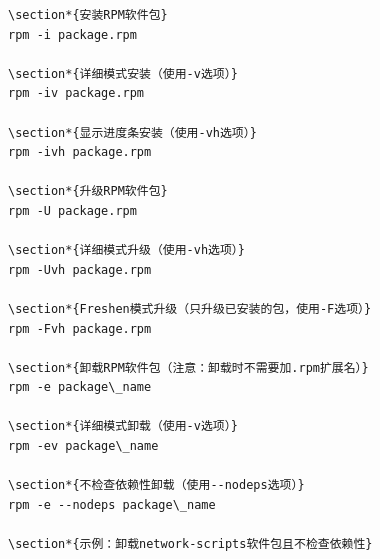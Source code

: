 \documentclass[12pt,UTF8]{ctexbook}
\begin{document}
\begin{verbatim}
\section*{安装RPM软件包}
rpm -i package.rpm

\section*{详细模式安装（使用-v选项）}
rpm -iv package.rpm

\section*{显示进度条安装（使用-vh选项）}
rpm -ivh package.rpm

\section*{升级RPM软件包}
rpm -U package.rpm

\section*{详细模式升级（使用-vh选项）}
rpm -Uvh package.rpm

\section*{Freshen模式升级（只升级已安装的包，使用-F选项）}
rpm -Fvh package.rpm

\section*{卸载RPM软件包（注意：卸载时不需要加.rpm扩展名）}
rpm -e package\_name

\section*{详细模式卸载（使用-v选项）}
rpm -ev package\_name

\section*{不检查依赖性卸载（使用--nodeps选项）}
rpm -e --nodeps package\_name

\section*{示例：卸载network-scripts软件包且不检查依赖性}

\end{verbatim}
\end{document}
